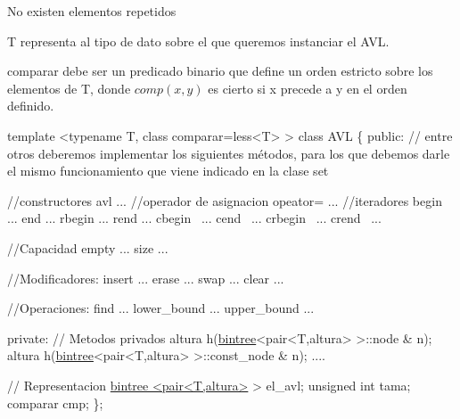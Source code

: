 \begin{DoxyItemize}
\item No existen elementos repetidos \item T representa al tipo de dato sobre el que queremos instanciar el A\+V\+L. \item comparar debe ser un predicado binario que define un orden estricto sobre los elementos de T, donde $ comp(x,y) $ es cierto si x precede a y en el orden definido.\end{DoxyItemize}

\begin{DoxyCode}
\textcolor{keyword}{template} <\textcolor{keyword}{typename} T, \textcolor{keyword}{class} comparar=less<T> >
\textcolor{keyword}{class }AVL \{
\textcolor{keyword}{public}:
\textcolor{comment}{// entre otros deberemos implementar los siguientes métodos, para los que debemos darle el mismo
       funcionamiento que viene indicado en la clase set}

\textcolor{comment}{//constructores}
avl ...
\textcolor{comment}{//operador de asignacion}
opeator=  ...
\textcolor{comment}{//iteradores}
begin  ...
end ...
rbegin ...
rend ...
cbegin  ...
cend  ...
crbegin  ...
crend  ...

\textcolor{comment}{//Capacidad}
empty ...
size ...

\textcolor{comment}{//Modificadores:}
insert  ...
erase ...
swap  ...
clear  ...

\textcolor{comment}{//Operaciones:}
find  ...
lower\_bound  ...
upper\_bound  ...

private:
  \textcolor{comment}{// Metodos privados}
   altura h(\hyperlink{classbintree}{bintree}<pair<T,altura> >::node & n);
   altura h(\hyperlink{classbintree}{bintree}<pair<T,altura> >::const\_node & n);
   .... 

 \textcolor{comment}{// Representacion}
  \hyperlink{classbintree}{bintree <pair<T,altura>} > el\_avl;
  \textcolor{keywordtype}{unsigned} \textcolor{keywordtype}{int} tama;
  comparar cmp;
\};
\end{DoxyCode}
 